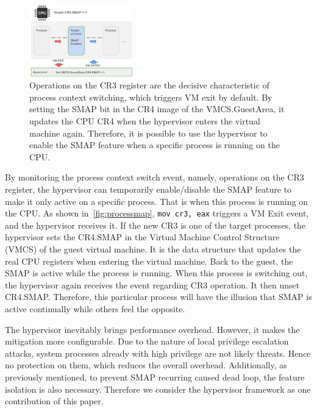 \begin{figure}[th]
  \includegraphics[width=0.40\textwidth]{figures/processmap3}
  \centering
  \caption{Operations on the CR3 register are the decisive characteristic of process context switching, which triggers VM exit by default. By setting the SMAP bit in the CR4 image of the VMCS.GuestArea, it updates the CPU CR4 when the hypervisor enters the virtual machine again. Therefore, it is possible to use the hypervisor to enable the SMAP feature when a specific process is running on the CPU.}
  \label{fig:processmap}
\end{figure}


By monitoring the process context switch event, namely, operations on the CR3 register, the hypervisor can temporarily enable/disable the SMAP feature to make it only active on a specific process. That is when this process is running on the CPU. As shown in~\autoref{fig:processmap}, \texttt{mov cr3, eax} triggers a VM Exit event, and the hypervisor receives it. If the new CR3 is one of the target processes, the hypervisor sets the CR4.SMAP in the Virtual Machine Control Structure (VMCS) of the guest virtual machine. It is the data structure that updates the real CPU registers when entering the virtual machine. Back to the guest, the SMAP is active while the process is running. When this process is switching out, the hypervisor again receives the event regarding CR3 operation. It then unset CR4.SMAP. Therefore, this particular process will have the illusion that SMAP is active continually while others feel the opposite.

The hypervisor inevitably brings performance overhead. However, it makes the mitigation more configurable. Due to the nature of local privilege escalation attacks, system processes already with high privilege are not likely threats. Hence no protection on them, which reduces the overall overhead.  Additionally, as previously mentioned, to prevent SMAP recurring caused dead loop, the feature isolation is also necessary. Therefore we consider the hypervisor framework as one contribution of this paper.
